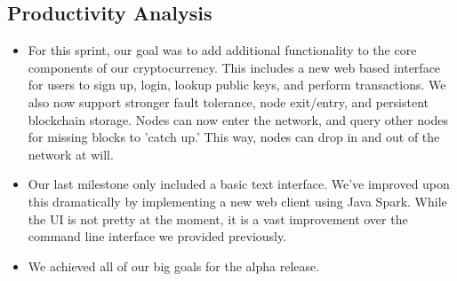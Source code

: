\documentclass[a4paper,12pt]{article}
\begin{document}
\subsection{Productivity Analysis} %
\begin{itemize}
\item For this sprint, our goal was to add additional functionality to the core components of our cryptocurrency. This includes a new web based interface for users to sign up, login, lookup public keys, and perform transactions. We also now support stronger fault tolerance, node exit/entry, and persistent blockchain storage. Nodes can now enter the network, and query other nodes for missing blocks to 'catch up.' This way, nodes can drop in and out of the network at will.
\item Our last milestone only included a basic text interface. We've improved upon this dramatically by implementing a new web client using Java Spark. While the UI is not pretty at the moment, it is a vast improvement over the command line interface we provided previously.
\item We achieved all of our big goals for the alpha release.
\end{itemize}
\end{document}
